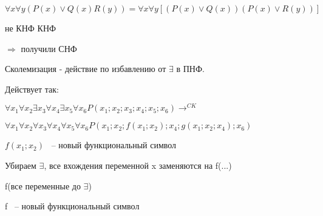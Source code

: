 \documentclass[russian]{lecture-notes}
\begin{document}
    \begin{example}

        $\forall x \forall y (P(x) \lor Q(x)R(y)) = \forall x \forall y [(P(x) \lor Q(x))(P(x) \lor R(y))]$

        \qquad \qquad \qquad \qquad не КНФ \qquad \qquad \qquad \qquad \qquad \qquad КНФ

        $\Rightarrow $ получили СНФ


        \end{example}

    \begin{definition}

        Сколемизация - действие по избавлению от $\exists$ в ПНФ.

        \end{definition}

    Действует так:

    $\forall x_{1} \forall x_{2} \exists x_{3} \forall x_{4} \exists x_{5} \forall x_{6} P(x_{1};x_{2};
    x_{3};x_{4};x_{5};x_{6}) \rightarrow^{CK}$
    
    $ \forall x_{1} \forall x_{2} \forall x_{3} \forall x_{4} \forall x_{5}
    \forall x_{6} P(x_{1};x_{2};f(x_{1};x_{2});x_{4};g(x_{1};x_{2};x_{4});x_{6})$

    $f(x_{1};x_{2})$ ~-- новый функциональный символ


    Убираем $\exists$, все вхождения переменной x заменяются на f(...)


    f(все переменные до $\exists$)

    f ~-- новый функциональный символ
\end{document}
